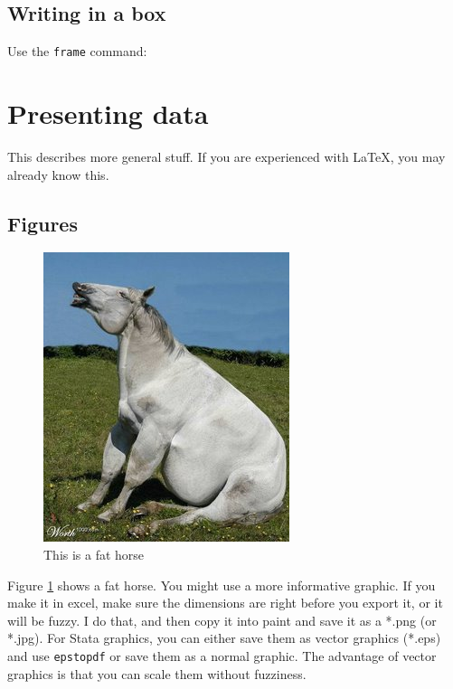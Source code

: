 \documentclass[10pt]{article}
\begin{document}
\subsection{Writing in a box}

Use the \texttt{frame} command:


\section{Presenting data}

This describes more general stuff.  If you are experienced with \LaTeX, you may already know this.

\subsection{Figures}
\begin{figure}[h]
\centering
\caption{This is a fat horse}
\label{fathorse}
\includegraphics[scale=.5]{images/Fat+Horse.jpg}
\end{figure}

Figure \ref{fathorse} shows a fat horse.  You might use a more informative graphic.  If you make it in excel, make sure the dimensions are right before you export it, or it will be fuzzy.  I do that, and then copy it into paint and save it as a *.png (or *.jpg).  For Stata graphics, you can either save them as vector graphics (*.eps) and use \texttt{epstopdf} or save them as a normal graphic.  The advantage of vector graphics is that you can scale them without fuzziness.
\end{document}
